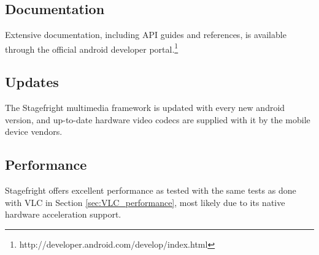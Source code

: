 \subsection{Documentation}
Extensive documentation, including API guides and references, is available through the official android developer portal.\footnote{http://developer.android.com/develop/index.html}
\subsection{Updates}
The Stagefright multimedia framework is updated with every new android version, and up-to-date hardware video codecs are supplied with it by the mobile device vendors.
\subsection{Performance}
Stagefright offers excellent performance as tested with the same tests as done with VLC in Section \ref{sec:VLC_performance}, most likely due to its native hardware acceleration support.


